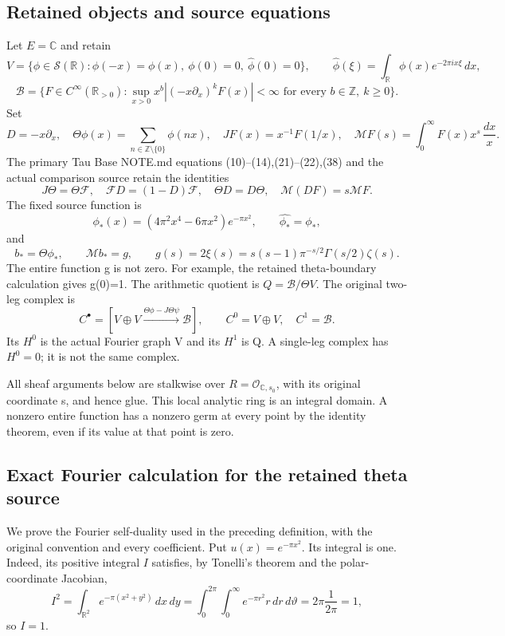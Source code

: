 \documentclass[10pt,a4paper,oneside]{report}
\begin{document}
\subsection{Retained objects and source equations}\label{proof06:typed-mellin:retained-objects-and-source-equations}

Let \(E=\mathbb C\) and retain \[
V=\{\phi\in\mathcal S(\mathbb R):\phi(-x)=\phi(x),\
\phi(0)=0,\ \widehat\phi(0)=0\},\qquad
\widehat\phi(\xi)=\int_{\mathbb R}\phi(x)e^{-2\pi i x\xi}\,dx,
\] \[
\mathscr B=\{F\in C^\infty(\mathbb R_{>0}):
\sup_{x>0}x^b|(-x\partial_x)^kF(x)|<\infty
\text{ for every }b\in\mathbb Z,\ k\ge0\}.
\] Set \[
D=-x\partial_x,\quad
\Theta\phi(x)=\sum_{n\in\mathbb Z\setminus\{0\}}\phi(nx),\quad
JF(x)=x^{-1}F(1/x),
\quad
\mathcal MF(s)=\int_0^\infty F(x)x^s\,\frac{dx}{x}.
\] The primary Tau Base NOTE.md equations (10)--(14),(21)--(22),(38) and the actual comparison source retain the identities \[
J\Theta=\Theta\mathcal F,\quad
\mathcal F D=(1-D)\mathcal F,\quad
\Theta D=D\Theta,\quad
\mathcal M(DF)=s\mathcal MF.
\] The fixed source function is \[
\phi_*(x)=(4\pi^2x^4-6\pi x^2)e^{-\pi x^2},\qquad
\widehat{\phi_*}=\phi_*,
\] and \[
b_*=\Theta\phi_*,\qquad
\mathcal Mb_*=g,\qquad
g(s)=2\xi(s)=s(s-1)\pi^{-s/2}\Gamma(s/2)\zeta(s).
\] The entire function g is not zero. For example, the retained theta-boundary calculation gives g(0)=1. The arithmetic quotient is \(Q=\mathscr B/\Theta V\). The original two-leg complex is \[
C^\bullet=[V\oplus V\xrightarrow{\Theta\phi-J\Theta\psi}\mathscr B],
\qquad C^0=V\oplus V,\quad C^1=\mathscr B.
\] Its \(H^0\) is the actual Fourier graph V and its \(H^1\) is Q. A single-leg complex has \(H^0=0\); it is not the same complex.

All sheaf arguments below are stalkwise over \(R=\mathcal O_{\mathbb C,s_0}\), with its original coordinate s, and hence glue. This local analytic ring is an integral domain. A nonzero entire function has a nonzero germ at every point by the identity theorem, even if its value at that point is zero.

\subsection{Exact Fourier calculation for the retained theta source}
\label{proof06:lem:typed-route-fourier-phi-star}

We prove the Fourier self-duality used in the preceding definition, with
the original convention and every coefficient. Put
\(u(x)=e^{-\pi x^2}\). Its integral is one. Indeed, its positive integral
\(I\) satisfies, by Tonelli's theorem and the polar-coordinate Jacobian,
\[
I^2=\int_{\mathbb R^2}e^{-\pi(x^2+y^2)}\,dx\,dy
 =\int_0^{2\pi}\int_0^\infty e^{-\pi r^2}r\,dr\,d\vartheta
 =2\pi\frac1{2\pi}=1,
\]
so \(I=1\).
\end{document}
